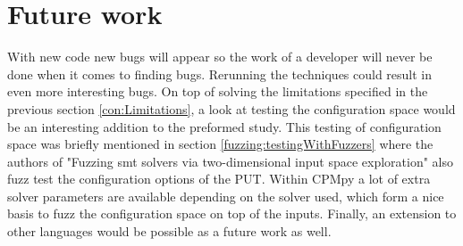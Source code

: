 


\section{Future work}
\label{con:FutureWork}
With new code new bugs will appear so the work of a developer will never be done when it comes to finding bugs. Rerunning the techniques could result in even more interesting bugs. 
On top of solving the limitations specified in the previous section \ref{con:Limitations},
a look at testing the configuration space would be an interesting addition to the preformed study. This testing of configuration space was briefly mentioned in section \ref{fuzzing:testingWithFuzzers} where the authors of "Fuzzing smt solvers via two-dimensional input space exploration" \cite{42FalconFuzzingConfigurationSettingsAndNormal} also fuzz test the configuration options of the PUT. Within CPMpy a lot of extra solver parameters are available depending on the solver used, which form a nice basis to fuzz the configuration space on top of the inputs.
Finally, an extension to other languages would be possible as a future work as well.


